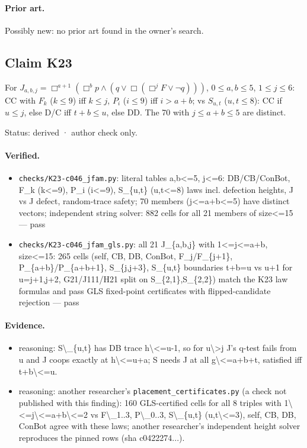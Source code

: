 \documentclass{article}
\begin{document}
\paragraph{Prior art.} Possibly new: no prior art found in the owner's search.

\subsection*{Claim K23}

For $J_{a,b,j}=\Box^{a+1}(\Box^b p\wedge(q\vee\Box(\Box^jF\vee\neg q)))$, $0\le a,b\le5$, $1\le j\le6$: CC with $F_k$ ($k\le9$) iff $k\le j$, $P_i$ ($i\le9$) iff $i>a+b$; vs $S_{u,t}$ ($u,t\le8$): CC if $u\le j$, else D/C iff $t+b\le u$, else DD. The 70 with $j\le a+b\le5$ are distinct.

Status: derived · author check only.

\paragraph{Verified.}
\begin{itemize}
\item \texttt{checks/K23-c046\_jfam.py}: literal tables a,b\textless{}=5, j\textless{}=6: DB/CB/ConBot, F\_k (k\textless{}=9), P\_i (i\textless{}=9), S\_\{u,t\} (u,t\textless{}=8) laws incl. defection heights, J vs J defect, random-trace safety; 70 members (j\textless{}=a+b\textless{}=5) have distinct vectors; independent string solver: 882 cells for all 21 members of size\textless{}=15 --- pass
\item \texttt{checks/K23-c046\_jfam\_gls.py}: all 21 J\_\{a,b,j\} with 1\textless{}=j\textless{}=a+b, size\textless{}=15: 265 cells (self, CB, DB, ConBot, F\_j/F\_\{j+1\}, P\_\{a+b\}/P\_\{a+b+1\}, S\_\{j,j+3\}, S\_\{u,t\} boundaries t+b=u vs u+1 for u=j+1,j+2, G21/J111/H21 split on S\_\{2,1\},S\_\{2,2\}) match the K23 law formulas and pass GLS fixed-point certificates with flipped-candidate rejection --- pass
\end{itemize}

\paragraph{Evidence.}
\begin{itemize}
\item reasoning: S\textbackslash{}\_\{u,t\} has DB trace h\textbackslash{}\textless{}=u-1, so for u\textbackslash{}\textgreater{}j J's q-test fails from u and J coops exactly at h\textbackslash{}\textless{}=u+a; S needs J at all g\textbackslash{}\textless{}=a+b+t, satisfied iff t+b\textbackslash{}\textless{}=u.
\item reasoning: another researcher's \texttt{placement\_certificates.py} (a check not published with this finding): 160 GLS-certified cells for all 8 triples with 1\textbackslash{}\textless{}=j\textbackslash{}\textless{}=a+b\textbackslash{}\textless{}=2 vs F\textbackslash{}\_1..3, P\textbackslash{}\_0..3, S\textbackslash{}\_\{u,t\} (u,t\textbackslash{}\textless{}=3), self, CB, DB, ConBot agree with these laws; another researcher's independent height solver reproduces the pinned rows (sha c0422274...).
\end{itemize}
\end{document}

